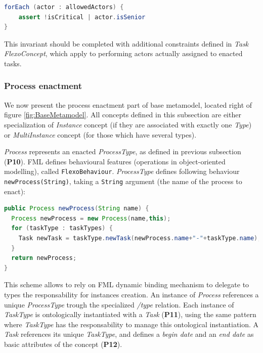 \begin{lstlisting}[breaklines=true, language=java, basicstyle=\ttfamily\scriptsize, mathescape=true]
forEach (actor : allowedActors) {
    assert !isCritical | actor.isSenior
}
\end{lstlisting}

This invariant should be completed with additional constraints defined in \textit{Task} \textit{FlexoConcept}, which apply to performing actors actually assigned to enacted tasks. 


\subsubsection{Process enactment}
\label{sec:ProcessEnactment}
We now present the process enactment part of base metamodel, located right of figure \ref{fig:BaseMetamodel}. All concepts defined in this subsection are either specialization of \textit{Instance} concept (if they are associated with exactly one \textit{Type}) or \textit{MultiInstance} concept (for those which have several types).

\textit{Process} represents an enacted \textit{ProcessType}, as defined in previous subsection (\textbf{P10}). FML defines behavioural features (operations in object-oriented modelling), called \texttt{FlexoBehaviour}. \textit{ProcessType} defines following behaviour \texttt{newProcess(String)}, taking a \texttt{String} argument (the name of the process to enact):

\begin{lstlisting}[breaklines=true, language=java, basicstyle=\ttfamily\scriptsize, mathescape=true]
public Process newProcess(String name) {    
  Process newProcess = new Process(name,this);  
  for (taskType : taskTypes) {      
    Task newTask = taskType.newTask(newProcess.name+"-"+taskType.name),newProcess);        
  }      
  return newProcess;    
}    
\end{lstlisting}

This scheme allows to rely on FML dynamic binding mechanism to delegate to types the responsability for instances creation. An instance of \textit{Process} references a unique \textit{ProcessType} trough the specialized \textit{/type} relation. Each instance of \textit{TaskType} is ontologically instantiated with a \textit{Task} (\textbf{P11}), using the same pattern where \textit{TaskType} has the responsability to manage this ontological instantiation. A \textit{Task} references its unique \textit{TaskType}, and defines a \textit{begin date} and an \textit{end date} as basic attributes of the concept (\textbf{P12}).

